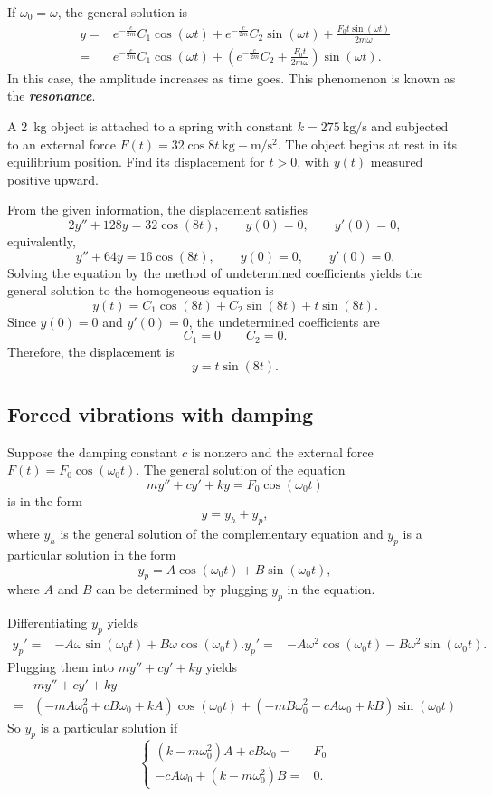 If $\omega_0=\omega$, the general solution is
\[
  \begin{aligned}
    y=&e^{-\frac{c}{2m}}C_1\cos(\omega t)+e^{-\frac{c}{2m}}C_2\sin(\omega t)+\frac{F_0t\sin(\omega t)}{2m \omega}\\
    =&e^{-\frac{c}{2m}}C_1\cos(\omega t)+\left(e^{-\frac{c}{2m}}C_2+\frac{F_0t}{2m \omega}\right)\sin(\omega t).
\end{aligned}
\]
In this case, the amplitude increases as time goes.
This phenomenon is known as the \emph{\textbf{resonance}}.

\begin{example}
  A \SI{2}{\kg} object is attached to a spring with constant $k = \SI{275}{\kg\per\second}$ and subjected to an external force $F(t)=32\cos{8t}~\si{\kg-\meter\per\square\second}$. The object begins at rest in its equilibrium position. Find its displacement for $t > 0$, with $y(t)$ measured positive upward.
\end{example}
\begin{solution}
  From the given information, the displacement satisfies
  \[2y''+128y=32\cos(8t),\qquad y(0)=0,\qquad y'(0)=0,\]
  equivalently,
  \[y''+64y=16\cos(8t),\qquad y(0)=0,\qquad y'(0)=0.\]
  Solving the equation by the method of undetermined coefficients yields the general solution to the homogeneous equation is 
  \[y(t)=C_1\cos(8t)+C_2\sin(8t)+t\sin(8t).\]
  Since $y(0)=0$ and $y'(0)=0$, the undetermined coefficients are
  \[C_1=0\qquad C_2=0.\]
  Therefore, the displacement is
  \[y=t\sin(8t).\]
\end{solution}

\subsection*{Forced vibrations with damping}

Suppose the damping constant $c$ is nonzero and the external force $F(t)=F_0\cos(\omega_0t)$. The general solution of the equation 
\[my''+cy'+ky=F_0\cos(\omega_0 t)\]
is in the form
\[y=y_h+y_p,\]
where $y_h$ is the general solution of the complementary equation and $y_p$ is a particular solution in the form
\[y_p=A\cos(\omega_0 t)+B\sin(\omega_0 t),\]
where $A$ and $B$ can be determined by plugging $y_p$ in the equation.

Differentiating $y_p$ yields
\[
  \begin{aligned}
    y_p'=&-A\omega\sin(\omega_0 t)+B\omega\cos(\omega_0 t).
    y_p'=&-A\omega^2\cos(\omega_0 t)-B\omega^2\sin(\omega_0 t).
  \end{aligned}
\]
Plugging them into $my''+cy'+ky$ yields
\[
  \begin{aligned}
    &my''+cy'+ky\\
    =&(-mA\omega_0^2+cB\omega_0+kA)\cos(\omega_0 t)+(-mB\omega_0^2-cA\omega_0+kB)\sin(\omega_0 t)
  \end{aligned}
\]
So $y_p$ is a particular solution if
\[
  \left\{
\begin{aligned}
  (k-m\omega_0^2)A+cB\omega_0=&F_0\\
  -cA\omega_0+(k-m\omega_0^2)B=&0.
\end{aligned} \right. 
\]

